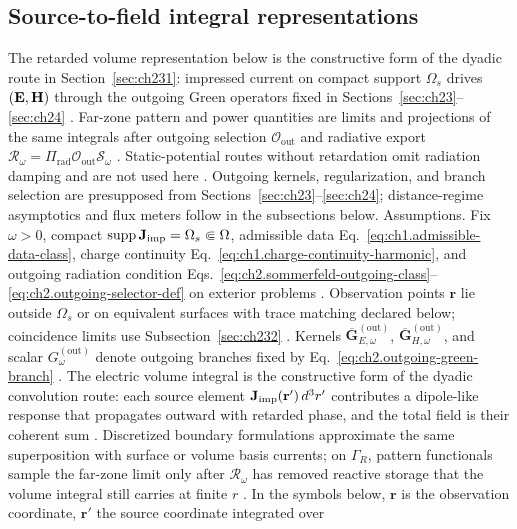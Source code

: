 \subsection{Source-to-field integral representations}
\label{sec:ch251}

The retarded volume representation below is the constructive form of the dyadic route in
Section~\ref{sec:ch231}: impressed current on compact support $\Omega_s$ drives $(\mathbf{E},\mathbf{H})$ through
the outgoing Green operators fixed in Sections~\ref{sec:ch23}--\ref{sec:ch24}
\cite{stratton1941,jackson1999}. Far-zone pattern and power quantities are limits and projections
of the same integrals after outgoing selection $\mathcal{O}_{\mathrm{out}}$ and radiative export
$\mathcal{R}_\omega=\Pi_{\mathrm{rad}}\mathcal{O}_{\mathrm{out}}\mathcal{S}_\omega$
\cite{sommerfeld1949}. Static-potential routes without retardation omit radiation damping and are
not used here \cite{jackson1999}. Outgoing kernels,
regularization, and branch selection are presupposed from Sections~\ref{sec:ch23}--\ref{sec:ch24};
distance-regime asymptotics and flux meters follow in the subsections below.
Assumptions. Fix \(\omega>0\), compact \(\operatorname{supp}\mathbf{J}_{\mathrm{imp}}=\Omega_s\Subset\Omega\), admissible
data Eq.~\eqref{eq:ch1.admissible-data-class}, charge continuity
Eq.~\eqref{eq:ch1.charge-continuity-harmonic}, and outgoing radiation condition
Eqs.~\eqref{eq:ch2.sommerfeld-outgoing-class}--\eqref{eq:ch2.outgoing-selector-def} on
exterior problems \cite{stratton1941}. Observation points \(\mathbf{r}\) lie outside
\(\Omega_s\) or on equivalent surfaces with trace matching declared below; coincidence
limits use Subsection~\ref{sec:ch232} \cite{harrington2001}. Kernels
\(\overline{\mathbf{G}}_{E,\omega}^{\mathrm{(out)}}\),
\(\overline{\mathbf{G}}_{H,\omega}^{\mathrm{(out)}}\), and scalar
\(G_\omega^{\mathrm{(out)}}\) denote outgoing branches fixed by
Eq.~\eqref{eq:ch2.outgoing-green-branch} \cite{stratton1941}.
The electric volume integral is the constructive form of the dyadic convolution route: each
source element \(\mathbf{J}_{\mathrm{imp}}(\mathbf{r}')\,d^{3}r'\) contributes a dipole-like response that
propagates outward with retarded phase, and the total field is their coherent sum
\cite{stratton1941}. Discretized boundary formulations approximate the same superposition with
surface or volume basis currents; on $\Gamma_R$, pattern functionals sample the far-zone limit only
after $\mathcal{R}_\omega$ has removed reactive storage that the volume integral still carries at
finite $r$ \cite{harrington2001}. In the symbols below,
$\mathbf{r}$ is the observation coordinate, $\mathbf{r}'$ the source coordinate integrated over
